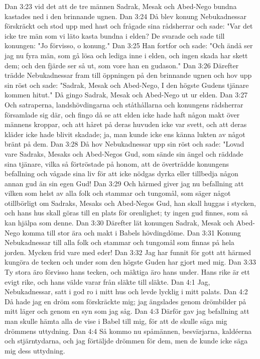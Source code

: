 Dan 3:23  vid det att de tre männen Sadrak, Mesak och Abed-Nego bundna kastades ned i den brinnande ugnen.
Dan 3:24  Då blev konung Nebukadnessar förskräckt och stod upp med hast och frågade sina rådsherrar och sade: "Var det icke tre män som vi läto kasta bundna i elden? De svarade och sade till konungen: "Jo förvisso, o konung."
Dan 3:25  Han fortfor och sade: "Och ändå ser jag nu fyra män, som gå lösa och lediga inne i elden, och ingen skada har skett dem; och den fjärde ser så ut, som vore han en gudason."
Dan 3:26  Därefter trädde Nebukadnessar fram till öppningen på den brinnande ugnen och hov upp sin röst och sade: "Sadrak, Mesak och Abed-Nego, I den högste Gudens tjänare kommen hitut." Då gingo Sadrak, Mesak och Abed-Nego ut ur elden.
Dan 3:27  Och satraperna, landshövdingarna och ståthållarna och konungens rådsherrar församlade sig där, och fingo då se att elden icke hade haft någon makt över männens kroppar, och att håret på deras huvuden icke var svett, och att deras kläder icke hade blivit skadade; ja, man kunde icke ens känna lukten av något bränt på dem.
Dan 3:28  Då hov Nebukadnessar upp sin röst och sade: "Lovad vare Sadraks, Mesaks och Abed-Negos Gud, som sände sin ängel och räddade sina tjänare, vilka så förtröstade på honom, att de överträdde konungens befallning och vågade sina liv för att icke nödgas dyrka eller tillbedja någon annan gud än sin egen Gud!
Dan 3:29  Och härmed giver jag nu befallning att vilken som helst av alla folk och stammar och tungomål, som säger något otillbörligt om Sadraks, Mesaks och Abed-Negos Gud, han skall huggas i stycken, och hans hus skall göras till en plats för orenlighet; ty ingen gud finnes, som så kan hjälpa som denne.
Dan 3:30  Därefter lät konungen Sadrak, Mesak och Abed-Nego komma till stor ära och makt i Babels hövdingdöme.
Dan 3:31  Konung Nebukadnessar till alla folk och stammar och tungomål som finnas på hela jorden. Mycken frid vare med eder!
Dan 3:32  Jag har funnit för gott att härmed kungöra de tecken och under som den högste Guden har gjort med mig.
Dan 3:33  Ty stora äro förvisso hans tecken, och mäktiga äro hans under. Hans rike är ett evigt rike, och hans välde varar från släkte till släkte.
Dan 4:1  Jag, Nebukadnessar, satt i god ro i mitt hus och levde lycklig i mitt palats.
Dan 4:2  Då hade jag en dröm som förskräckte mig; jag ängslades genom drömbilder på mitt läger och genom en syn som jag såg.
Dan 4:3  Därför gav jag befallning att man skulle hämta alla de vise i Babel till mig, för att de skulle säga mig drömmens uttydning.
Dan 4:4  Så kommo nu spåmännen, besvärjarna, kaldéerna och stjärntydarna, och jag förtäljde drömmen för dem, men de kunde icke säga mig dess uttydning.

